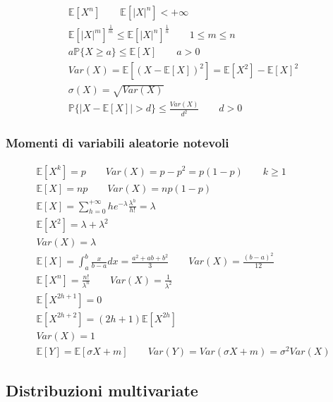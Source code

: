 \begin{align}
	\mathbb{E}[X^n] \quad\quad \mathbb{E}[\lvert X \rvert ^n] < +\infty \tag{Momento}\\
	\mathbb{E}[\lvert X \rvert ^m] ^{\frac{1}{m}} \leq \mathbb{E}[\lvert X \rvert^n]^{\frac{1}{n}} \quad\quad 1 \leq m \leq n \tag{Disuguaglianza di Jensen}\\
	a\mathbb{P}\{X \geq a\}\leq \mathbb{E}[X] \quad\quad a>0 \tag{Disuguaglianza di Markov}\\
	Var(X) = \mathbb{E}[(X-\mathbb{E}[X])^2] = \mathbb{E}[X^2] - \mathbb{E}[X]^2 \tag{Varianza}\\
	\sigma(X) = \sqrt{Var(X)} \tag{Scarto quadratico medio} \\
	\mathbb{P}\{\lvert X -\mathbb{E}[X] \rvert > d\} \leq \frac{Var(X)}{d^2} \quad\quad d>0 \tag{Disuguaglianza di Chebyshev}
\end{align}

\subsubsection{Momenti di variabili aleatorie notevoli}
\begin{align}
	\mathbb{E}[X^k] = p \quad\quad Var(X) = p-p^2 = p(1-p) \quad \quad k \geq 1 \tag{Bernoulli} \\
	\mathbb{E}[X] = np \quad\quad Var(X) = np(1-p) \tag{Binomiali} \\
	\mathbb{E}[X] = \sum_{h=0}^{+\infty}he^{-\lambda} \frac{\lambda^h}{h!}=\lambda \tag{Poisson} \\
	\mathbb{E}[X^2] = \lambda + \lambda^2\\
	Var(X) = \lambda\\
	\mathbb{E}[X] = \int_{a}^{b} \frac{x}{b-a}dx = \frac{a^2+ab+b^2}{3} \quad\quad Var(X) = \frac{(b-a)^2}{12} \tag{Uniformi su intervalli finiti}\\
	\mathbb{E}[X^n] = \frac{n!}{\lambda^n} \quad\quad Var(X) =\frac{1}{\lambda^2} \tag{Esponenziali} \\
	\mathbb{E}[X^{2h+1}] = 0 \tag{Gaussiana standard}\\
	\mathbb{E}[X^{2h+2}] = (2h+1)\mathbb{E}[X^{2h}] \\
	Var(X) = 1\\
	\mathbb{E}[Y] = \mathbb{E}[\sigma X + m]\quad\quad Var(Y) = Var(\sigma X + m) = \sigma^2 Var(X) \tag{Gaussiana non standard}
\end{align}

\subsection{Distribuzioni multivariate}

